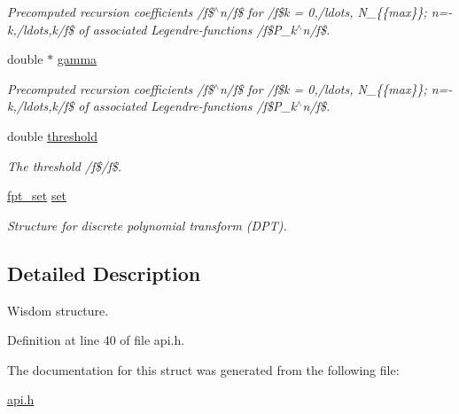 \begin{CompactItemize}
\begin{CompactList}\small\item\em Precomputed recursion coefficients /f\$$^\wedge$n/f\$ for /f\$k = 0,/ldots, N\_\-\{\{max\}\}; n=-k,/ldots,k/f\$ of associated Legendre-functions /f\$P\_\-k$^\wedge$n/f\$. \item\end{CompactList}\item 
\hypertarget{structnfsft__wisdom_o6}{
double $\ast$ \hyperlink{structnfsft__wisdom_o6}{gamma}}
\label{structnfsft__wisdom_o6}

\begin{CompactList}\small\item\em Precomputed recursion coefficients /f\$$^\wedge$n/f\$ for /f\$k = 0,/ldots, N\_\-\{\{max\}\}; n=-k,/ldots,k/f\$ of associated Legendre-functions /f\$P\_\-k$^\wedge$n/f\$. \item\end{CompactList}\item 
\hypertarget{structnfsft__wisdom_o7}{
double \hyperlink{structnfsft__wisdom_o7}{threshold}}
\label{structnfsft__wisdom_o7}

\begin{CompactList}\small\item\em The threshold /f\$/f\$. \item\end{CompactList}\item 
\hypertarget{structnfsft__wisdom_o8}{
\hyperlink{structfpt__set__s__}{fpt\_\-set} \hyperlink{structnfsft__wisdom_o8}{set}}
\label{structnfsft__wisdom_o8}

\begin{CompactList}\small\item\em Structure for {\em discrete\/} {\em polynomial\/} {\em transform\/} ({\em DPT\/}). \item\end{CompactList}\end{CompactItemize}


\subsection{Detailed Description}
Wisdom structure. 



Definition at line 40 of file api.h.

The documentation for this struct was generated from the following file:\begin{CompactItemize}
\item 
\hyperlink{api_8h}{api.h}\end{CompactItemize}
